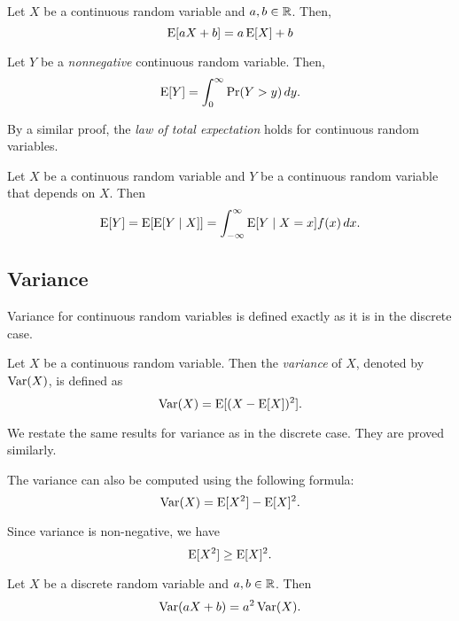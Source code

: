 \documentclass{article}
\begin{document}
\begin{corollary}
  Let $X$ be a continuous random variable and $a, b \in \mathbb{R}$.
  Then,
  \[
    \operatorname{E}[aX + b] = a \operatorname{E}[X] + b
  \]
\end{corollary}

\begin{lemma}
  Let $Y$ be a \emph{nonnegative} continuous random variable.
  Then,
  \[
    \operatorname{E}[Y] = \int_{0}^\infty \Pr(Y > y) \, dy.
  \]
\end{lemma}

By a similar proof, the \emph{law of total expectation} holds for continuous random variables.

\begin{theorem}
  Let $X$ be a continuous random variable and $Y$ be a continuous random variable that depends on $X$.
  Then
  \[
    \operatorname{E}[Y] = \operatorname{E}[\operatorname{E}[Y \mid X]] = \int_{-\infty}^\infty \operatorname{E}[Y \mid X = x] f(x) \, dx.
  \]
\end{theorem}

\subsection{Variance}

Variance for continuous random variables is defined exactly as it is in the discrete case.

\begin{definition}
  Let $X$ be a continuous random variable.
  Then the \emph{variance} of $X$, denoted by $\operatorname{Var}(X)$, is defined as
  \[
    \operatorname{Var}(X) = \operatorname{E}[(X - \operatorname{E}[X])^2].
  \]
\end{definition}

We restate the same results for variance as in the discrete case.
They are proved similarly.

\begin{remark}
  The variance can also be computed using the following formula:
  \[
    \operatorname{Var}(X) = \operatorname{E}[X^2] - \operatorname{E}[X]^2.
  \]
\end{remark}

\begin{remark}
  Since variance is non-negative, we have
  \[
    \operatorname{E}[X^2] \geq \operatorname{E}[X]^2.
  \]
\end{remark}

\begin{proposition}
  Let $X$ be a discrete random variable and $a, b \in \mathbb{R}$.
  Then
  \[
    \operatorname{Var}(a X + b) = a^2 \operatorname{Var}(X).
  \]
\end{proposition}
\end{document}
